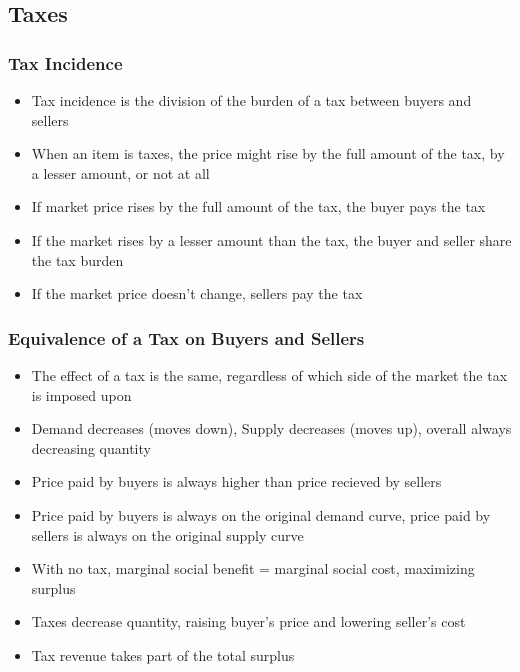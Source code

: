 \documentclass[11pt]{article}
\begin{document}
\subsection{Taxes}
\label{sec:orge023cc8}
\subsubsection{Tax Incidence}
\label{sec:org5c7a16c}
\begin{itemize}
\item Tax incidence is the division of the burden of a tax between buyers and sellers
\item When an item is taxes, the price might rise by the full amount of the tax, by a lesser amount,
or not at all
\item If market price rises by the full amount of the tax, the buyer pays the tax
\item If the market rises by a lesser amount than the tax, the buyer and seller share the tax burden
\item If the market price doesn't change, sellers pay the tax
\end{itemize}
\subsubsection{Equivalence of a Tax on Buyers and Sellers}
\label{sec:orgb5c5d4f}
\begin{itemize}
\item The effect of a tax is the same, regardless of which side of the market the tax is imposed upon
\item Demand decreases (moves down), Supply decreases (moves up), overall always decreasing quantity
\item Price paid by buyers is always higher than price recieved by sellers
\item Price paid by buyers is always on the original demand curve, price paid by sellers is 
always on the original supply curve
\item With no tax, marginal social benefit = marginal social cost, maximizing surplus
\item Taxes decrease quantity, raising buyer's price and lowering seller's cost
\item Tax revenue takes part of the total surplus
\end{itemize}
\end{document}

